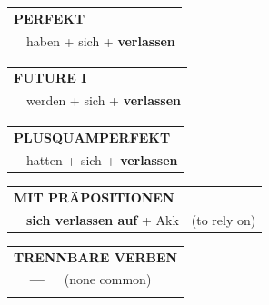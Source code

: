 \documentclass[10pt,a4paper]{revtex4-2}
\begin{document}
\begin{verbbox}
    \vspace{10pt}

 \begin{tabular}{rl}
     \multicolumn{2}{l}{\textbf{PERFEKT}}\\
   & haben + sich + \textbf{verlassen}\\
  \end{tabular}
\hfill
   \begin{tabular}{rl}
    \multicolumn{2}{l}{\textbf{FUTURE I} }\\
   & werden + sich + \textbf{verlassen}\\
  \end{tabular}
\hfill
   \begin{tabular}{rl}
      \multicolumn{2}{l}{\textbf{PLUSQUAMPERFEKT}}\\
   & hatten + sich + \textbf{verlassen}\\
  \end{tabular}

   \vspace{10pt}

   \begin{tabular}{lll}
      \multicolumn{3}{l}{\textbf{MIT PRÄPOSITIONEN}}\\
& \textbf{sich verlassen auf} + Akk & (to rely on)\\
\end{tabular}
  \hfill
   \begin{tabular}{lll}
      \multicolumn{3}{l}{\textbf{TRENNBARE VERBEN}}\\
 & \textbf{---} & (none common)\\
\vspace{10pt}
  \end{tabular}

  \vspace{-5pt}

\end{verbbox}
\end{document}
